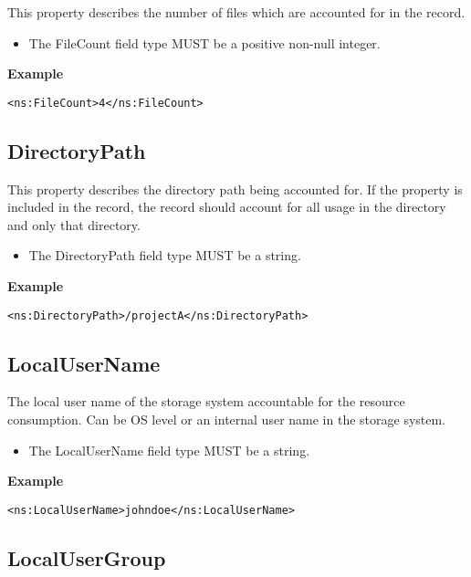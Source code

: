 This property describes the number of files which are accounted for in the
record.

\begin{itemize}
\item The FileCount field type MUST be a positive non-null integer.
\end{itemize}

{\bf Example}
\begin{verbatim}
<ns:FileCount>4</ns:FileCount>
\end{verbatim}



\subsection{DirectoryPath}

This property describes the directory path being accounted for. If the property
is included in the record, the record should account for all usage in the
directory and only that directory.


\begin{itemize}
\item The DirectoryPath field type MUST be a string.
\end{itemize}

{\bf Example}
\begin{verbatim}
<ns:DirectoryPath>/projectA</ns:DirectoryPath>
\end{verbatim}



\subsection{LocalUserName}

The local user name of the storage system accountable for the resource
consumption. Can be OS level or an internal user name in the storage system.

\begin{itemize}
\item The LocalUserName field type MUST be a string.
\end{itemize}

{\bf Example}
\begin{verbatim}
<ns:LocalUserName>johndoe</ns:LocalUserName>
\end{verbatim}


\subsection{LocalUserGroup}

